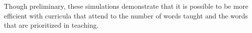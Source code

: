 \documentclass[10pt,letterpaper]{article}
\begin{document}
Though preliminary, these simulations demonstrate that it is possible to be more efficient with curricula that attend to the number of words taught and the words that are prioritized in teaching.





\setlength{\bibleftmargin}{.125in}
\setlength{\bibindent}{-\bibleftmargin}


\end{document}
